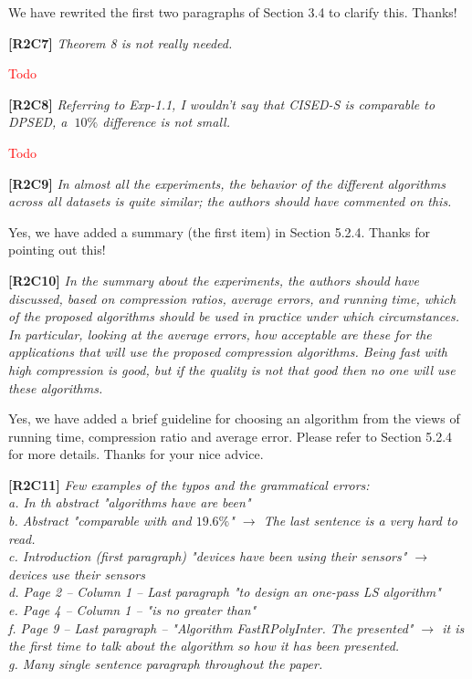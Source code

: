\documentclass{letter}
\begin{document}
We have rewrited the first two paragraphs of Section 3.4 to clarify this. Thanks!

\textbf{[R2C7]} \emph{Theorem 8 is not really needed.}

\textcolor{red}{Todo}

\textbf{[R2C8]} \emph{Referring to Exp-1.1, I wouldn't say that CISED-S is comparable to DPSED, a $~10\%$ difference is not small.}

\textcolor{red}{Todo}

\textbf{[R2C9]} \emph{In almost all the experiments, the behavior of the different algorithms across all datasets is quite similar; the authors should have commented on this.}

Yes, we have added a summary (the first item) in Section 5.2.4. Thanks for pointing out this!

\textbf{[R2C10]} \emph{In the summary about the experiments, the authors should have discussed, based on compression ratios, average errors, and running time, which of the proposed algorithms should be used in practice under which circumstances. In particular, looking at the average errors, how acceptable are these for the applications that will use the proposed compression algorithms. Being fast with high compression is good, but if the quality is not that good then no one will use these algorithms.}

Yes, we have added a brief guideline for choosing an algorithm from the views of running time, compression ratio and average error. Please refer to Section 5.2.4 for more details. Thanks for your nice advice.

\textbf{[R2C11]} \emph{Few examples of the typos and the grammatical errors: \\
   a. In th abstract "algorithms have are been"	\\
   b. Abstract "comparable with and $19.6\%$" $\rightarrow$ The last sentence is a very hard to read.	\\
   c. Introduction (first paragraph) "devices have been using their sensors" $\rightarrow$ devices use their sensors	\\
   d. Page 2 -- Column 1 -- Last paragraph "to design an one-pass LS algorithm" \\
   e. Page 4 -- Column 1 -- "is no greater than" \\
   f. Page 9 -- Last paragraph -- "Algorithm FastRPolyInter. The presented" $\rightarrow$ it is the first time to talk about the algorithm so how it has been presented. \\
   g. Many single sentence paragraph throughout the paper. 
}
\end{document}

